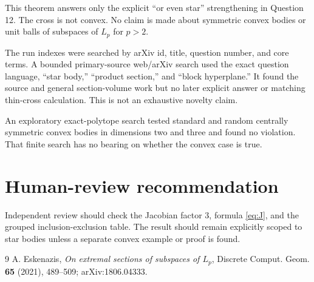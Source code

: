 \documentclass[11pt]{article}
\newcommand{\1}{\mathbf 1}
\begin{document}
This theorem answers only the explicit ``or even star'' strengthening in
Question 12.  The cross is not convex.  No claim is made about symmetric
convex bodies or unit balls of subspaces of $L_p$ for $p>2$.

The run indexes were searched by arXiv id, title, question number, and core
terms.  A bounded primary-source web/arXiv search used the exact question
language, ``star body,'' ``product section,'' and ``block hyperplane.''  It
found the source and general section-volume work but no later explicit answer
or matching thin-cross calculation.  This is not an exhaustive novelty claim.

An exploratory exact-polytope search tested standard and random centrally
symmetric convex bodies in dimensions two and three and found no violation.
That finite search has no bearing on whether the convex case is true.

\section{Human-review recommendation}

Independent review should check the Jacobian factor $3$, formula
\eqref{eq:J}, and the grouped inclusion-exclusion table.  The result should
remain explicitly scoped to star bodies unless a separate convex example or
proof is found.

\begin{thebibliography}{9}
A. Eskenazis,
\emph{On extremal sections of subspaces of $L_p$},
Discrete Comput. Geom. \textbf{65} (2021), 489--509;
arXiv:1806.04333.
\end{thebibliography}
\end{document}
